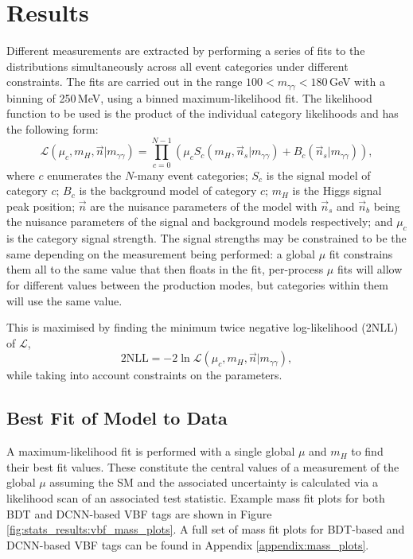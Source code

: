 \section{Results}
Different measurements are extracted by performing a series of fits to the \mgg distributions simultaneously across all event categories under different constraints. 
The fits are carried out in the range $100 < m_{\gamma\gamma} < 180$\,GeV with a binning of 250\,MeV, using a binned maximum-likelihood fit.
The likelihood function to be used is the product of the individual category likelihoods and has the following form:
\begin{equation}
    \mathcal{L}(\mu_{c},m_H,\vec{n}|m_{\gamma\gamma}) = \prod_{c=0}^{N-1} \left( \mu_{c} S_{c}( m_{H}, \vec{n}_{s} | m_{\gamma\gamma}) + B_{c}( \vec{n}_{s} | m_{\gamma\gamma}) \right),
\end{equation}
where $c$ enumerates the $N$-many event categories; $S_{c}$ is the signal model of category $c$; $B_{c}$ is the background model of category $c$; $m_H$ is the Higgs signal peak position; $\vec{n}$ are the nuisance parameters of the model with $\vec{n}_s$ and $\vec{n}_b$ being the nuisance parameters of the signal and background models respectively; and $\mu_{c}$ is the category signal strength. 
The signal strengths may be constrained to be the same depending on the measurement being performed: a global $\mu$ fit constrains them all to the same value that then floats in the fit, per-process $\mu$ fits will allow for different values between the production modes, but categories within them will use the same value. 

This is maximised by finding the minimum twice negative log-likelihood (2NLL) of $\mathcal{L}$, 
\begin{equation}
    2\mathrm{NLL} = -2\ln\mathcal{L}(\mu_{c},m_H,\vec{n}|m_{\gamma\gamma}),
\end{equation}
while taking into account constraints on the parameters. 


\subsection{Best Fit of Model to Data}
A maximum-likelihood fit is performed with a single global $\mu$ and $m_H$ to find their best fit values.
These constitute the central values of a measurement of the global $\mu$ assuming the SM and the associated uncertainty is calculated via a likelihood scan of an associated test statistic. 
Example mass fit plots for both BDT and DCNN-based VBF tags are shown in Figure \ref{fig:stats_results:vbf_mass_plots}.
A full set of mass fit plots for BDT-based and DCNN-based VBF tags can be found in Appendix \ref{appendix:mass_plots}.

